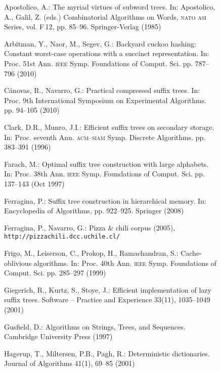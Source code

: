 \documentclass{llncs}
\let\bibtla\textsc
\begin{document}
\begin{figure}[t]
\begin{thebibliography}{10}
\providecommand{\url}[1]{\texttt{#1}}
\providecommand{\urlprefix}{URL }

Apostolico, A.: The myriad virtues of subword trees. In: Apostolico, A., Galil,
  Z. (eds.) Combinatorial Algorithms on Words, {\bibtla{nato}} {\bibtla{asi}}
  Series, vol. F\,12, pp. 85--96. Springer-Verlag (1985)

Arbitman, Y., Naor, M., Segev, G.: Backyard cuckoo hashing: Constant worst-case
  operations with a succinct representation. In: Proc. 51st Ann.
  {\bibtla{ieee}} Symp. Foundations of {Comput. Sci.} pp. 787--796 (2010)

C{\'a}novas, R., Navarro, G.: Practical compressed suffix trees. In: Proc. 9th
  International Symposium on Experimental Algorithms. pp. 94--105 (2010)

Clark, D.R., Munro, J.I.: Efficient suffix trees on secondary storage. In:
  Proc. seventh Ann. {\bibtla{acm}}--{\bibtla{siam}} Symp. Discrete Algorithms.
  pp. 383--391 (1996)

Farach, M.: Optimal suffix tree construction with large alphabets. In: Proc.
  38th Ann. {\bibtla{ieee}} Symp. Foundations of {Comput. Sci.} pp. 137--143
  (Oct 1997)

Ferragina, P.: Suffix tree construction in hierarchical memory. In:
  Encyclopedia of Algorithms, pp. 922--925. Springer (2008)

Ferragina, P., Navarro, G.: Pizza \& chili corpus (2005),
  \url{http://pizzachili.dcc.uchile.cl/}

Frigo, M., Leiserson, C., Prokop, H., Ramachandran, S.: Cache-oblivious
  algorithms. In: Proc. 40th Ann. {\bibtla{ieee}} Symp. Foundations of {Comput.
  Sci.} pp. 285--297 (1999)

Giegerich, R., Kurtz, S., Stoye, J.: Efficient implementation of lazy suffix
  trees. Software -- Practice and Experience  33(11),  1035--1049 (2001)

Gusfield, D.: Algorithms on Strings, Trees, and Sequences. Cambridge University
  Press (1997)

Hagerup, T., Miltersen, P.B., Pagh, R.: Deterministic dictionaries. Journal of
  Algorithms  41(1),  69--85 (2001)


\end{thebibliography}
\end{figure}
\end{document}
